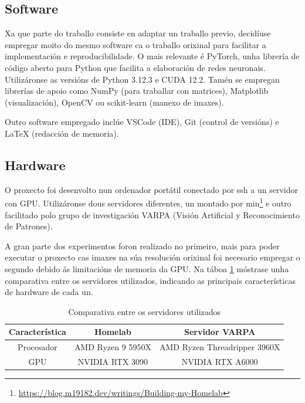 \subsection{Software}
\label{subsec:Software}

Xa que parte do traballo consiste en adaptar un traballo previo, 
decidíuse empregar moito do mesmo software ca o traballo orixinal para facilitar a implementación e reproducibilidade.
O mais relevante é PyTorch, unha librería de código aberto para Python que facilita a elaboración de redes neuronais. Utilizáronse as versións de Python 3.12.3 e CUDA 12.2. Tamén se empregan librerías de apoio como NumPy (para traballar con matrices), Matplotlib (visualización), OpenCV ou scikit-learn (manexo de imaxes).

Outro software empregado inclúe VSCode (IDE), Git (control de versións) e LaTeX (redacción de memoria).

\subsection{Hardware}
\label{subsec:Hardware}

O proxecto foi desenvolto nun ordenador portátil conectado por ssh a un servidor con GPU. 
Utilizáronse dous servidores diferentes, un montado por min\footnote{\url{https://blog.m19182.dev/writings/Building-my-Homelab}} e outro facilitado polo grupo de investigación VARPA (Visión Artificial y Reconocimiento de Patrones).

A gran parte dos experimentos foron realizado no primeiro, mais para poder executar o proxecto cas imaxes na súa resolución orixinal foi necesario empregar o segundo 
debido ás limitacións de memoria da GPU. Na táboa \ref{tab:comparativa_servidores} móstrase unha comparativa entre os servidores utilizados, indicando as principais características de hardware de cada un.

\begin{table}[tbp]
\centering
\begin{tabular}{|c|c|c|}
\hline
\textbf{Característica} & \textbf{Homelab} & \textbf{Servidor VARPA} \\ \hline
Procesador & AMD Ryzen 9 5950X&  AMD Ryzen Threadripper 3960X \\ \hline
GPU & NVIDIA RTX 3090 & NVIDIA RTX A6000  \\ \hline
\end{tabular}
\caption{Comparativa entre os servidores utilizados}
\label{tab:comparativa_servidores}
\end{table}


